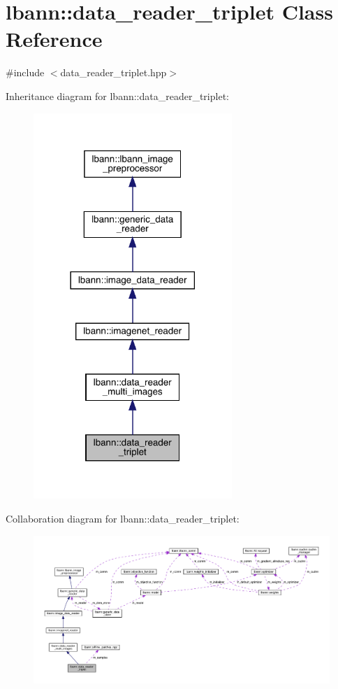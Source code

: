 \hypertarget{classlbann_1_1data__reader__triplet}{}\section{lbann\+:\+:data\+\_\+reader\+\_\+triplet Class Reference}
\label{classlbann_1_1data__reader__triplet}


{\ttfamily \#include $<$data\+\_\+reader\+\_\+triplet.\+hpp$>$}



Inheritance diagram for lbann\+:\+:data\+\_\+reader\+\_\+triplet\+:\nopagebreak
\begin{figure}[H]
\begin{center}
\leavevmode
\includegraphics[width=213pt]{classlbann_1_1data__reader__triplet__inherit__graph}
\end{center}
\end{figure}


Collaboration diagram for lbann\+:\+:data\+\_\+reader\+\_\+triplet\+:\nopagebreak
\begin{figure}[H]
\begin{center}
\leavevmode
\includegraphics[width=350pt]{classlbann_1_1data__reader__triplet__coll__graph}
\end{center}
\end{figure}
